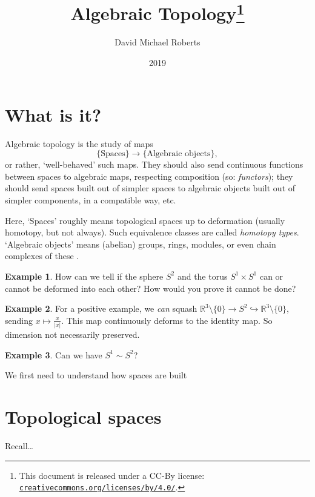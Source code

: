 \documentclass{tufte-handout}
\title{Algebraic Topology\thanks{This document is released under a CC-By license: 
\href{https://creativecommons.org/licenses/by/4.0/}{\texttt{creativecommons.org/licenses/by/4.0/}}.}
}
\author[D.M.~Roberts]{David Michael Roberts}
\date{2019}
\def\into {\hookrightarrow}
\def\RR{\mathbb{R}}
\newcommand{\lecturenum}[1]{\marginnote{\color{red}Lecture #1}}
\theoremstyle{definition}
\newtheorem{example}{Example}
\begin{document}
 

\maketitle

\lecturenum{1} \section{What is it?}

Algebraic topology is the study of maps 
\[
	\{\text{Spaces}\} \longrightarrow \{\text{Algebraic objects}\},
\] 
%
or rather, `well-behaved' such maps. They should also send continuous functions between spaces to 
algebraic maps, respecting composition (so: \emph{functors}); they should send spaces built 
out of simpler spaces to algebraic objects built out of simpler components, in a compatible way, 
etc.

Here, `Spaces' roughly means topological spaces up to deformation (usually homotopy, but not 
always). Such equivalence classes are called \emph{homotopy types}. `Algebraic objects' means  
(abelian) groups, rings, modules, or even chain complexes of these .

\begin{example} 
	How can we tell if the sphere $S^2$ and the torus $S^1\times S^1$ can or 
	cannot be deformed into each other? How would you prove it cannot be done? 
\end{example}

\begin{example} 
	For a positive example, we \emph{can} squash $\RR^3 \setminus \{0\} \to S^2 \into 
	\RR^3 \setminus \{0\} $, sending $x\mapsto \frac{x}{|x|}$. This map continuously 
	deforms to the identity map. So dimension not necessarily preserved.
\end{example}

\begin{example} 
	Can we have $S^1 \sim S^2$? 
\end{example} 

\noindent We first need to understand how spaces are built

\section{Topological spaces}

Recall\ldots{}
\end{document}

